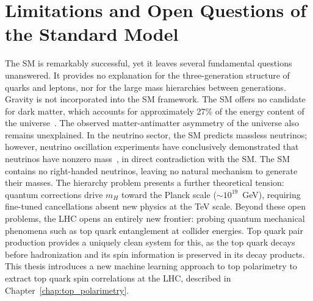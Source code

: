\section{Limitations and Open Questions of the Standard Model}
\label{sec:open_questions}
The SM is remarkably successful, yet it leaves several fundamental questions unanswered. 
It provides no explanation for the three-generation structure of quarks and leptons, nor for the large mass hierarchies between generations.
Gravity is not incorporated into the SM framework. 
The SM offers no candidate for dark matter, which accounts for approximately 27\% of the energy content of the universe~\cite{Planck:CosmParams2020}. 
The observed matter-antimatter asymmetry of the universe also remains unexplained.
In the neutrino sector, the SM predicts massless neutrinos; however, neutrino oscillation experiments have conclusively demonstrated that neutrinos have nonzero mass~\cite{SuperK:AtmNeutrino1998, SNO:SolarNeutrino2002}, in direct contradiction with the SM. 
The SM contains no right-handed neutrinos, leaving no natural mechanism to generate their masses. 
The hierarchy problem presents a further theoretical tension: quantum corrections drive $m_H$ toward the Planck scale ($\sim 10^{19}$~GeV), requiring fine-tuned cancellations absent new physics at the TeV scale.
Beyond these open problems, the LHC opens an entirely new frontier: probing quantum mechanical phenomena such as top quark entanglement at collider energies.
Top quark pair production provides a uniquely clean system for this, as the top quark decays before hadronization and its spin information is preserved in its decay products. 
This thesis introduces a new machine learning approach to top polarimetry to extract top quark spin correlations at the LHC, described in Chapter~\ref{chap:top_polarimetry}.
